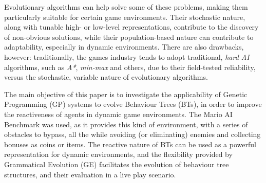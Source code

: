\documentclass[conference]{IEEEtran}
\begin{document}
Evolutionary algorithms can help solve some of these problems, making them
particularly suitable for certain game environments. Their stochastic nature,
along with tunable high- or low-level representations, contribute to the
discovery of non-obvious solutions, while their population-based nature can
contribute to adaptability, especially in dynamic environments. There are
also drawbacks, however: traditionally, the games industry tends to adopt
traditional, \textit{hard AI} algorithms, such as \textit{A*},
\textit{min-max} and others, due to their field-tested reliability, versus the
stochastic, variable nature of evolutionary algorithms.

The main objective of this paper is to investigate the applicability of Genetic
Programming \cite{Koz92} (GP) systems to evolve Behaviour Trees \cite{CH07}
(BTs), in order to improve the reactiveness of agents in dynamic game environments. 
The Mario AI Benchmark was used, as it provides this kind of environment, with
a series of obstacles to bypass, all the while avoiding (or eliminating)
enemies and collecting bonuses as coins or items. The reactive nature of BTs can 
be used as a powerful representation for dynamic environments, and the flexibility 
provided by Grammatical Evolution \cite{OR03} (GE) facilitates the evolution of
behaviour tree structures, and their evaluation in a live play scenario.

%
%
%
\end{document}
